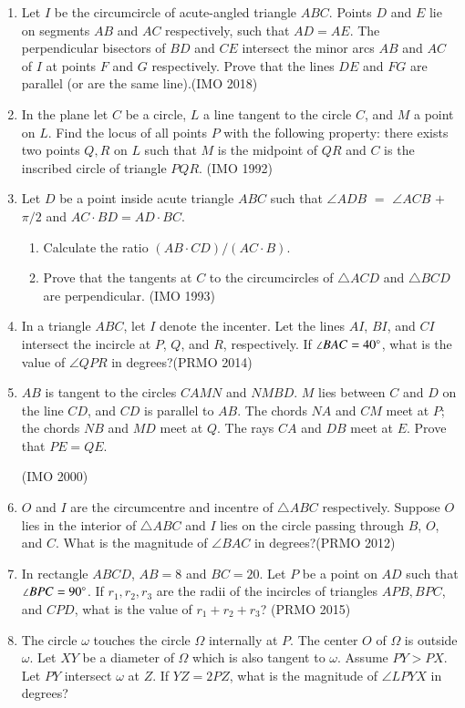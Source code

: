 \begin{enumerate}[label=\thesubsection.\arabic*,ref=\thesubsection.\theenumi]
\item Let $I$ be the circumcircle of acute-angled triangle $ABC$. Points $D$ and $E$     lie on segments $AB$ and $AC$ respectively, such that $AD=AE$. The perpendicular bisectors of $BD$ and $CE$ intersect the minor arcs $AB$ and $AC$ of $I$ at points $F$ and $G$ respectively. Prove that the lines $DE$ and $FG$ are parallel (or are the same line).\hfill (IMO  2018)
\item In the plane let $C$ be a circle, $L$ a line  tangent to the circle $C$, and $M$ a point on $L$. Find the locus of all points $P$ with the following property: there exists two points $Q,R$ on $L$ such that $M$ is the midpoint of $QR$ and $C$ is the inscribed circle of triangle $PQR$.  \hfill(IMO  1992)
\item Let $D$ be a point inside acute triangle $ABC$ such that $\angle ADB$ $=$ $\angle ACB$ $+$ $\pi/2$ and $AC \cdot BD = AD \cdot BC$.
 
\begin{enumerate}
\item Calculate the ratio $(AB \cdot CD) / (AC \cdot B)$.
\item Prove that the tangents at $C$ to the circumcircles of $\triangle ACD$ and $\triangle BCD$ are perpendicular. \hfill(IMO  1993)
\end{enumerate}
\item In a triangle $ABC$, let $I$ denote the incenter. Let the lines $AI$, $BI$, and $CI$ intersect the incircle at $P$, $Q$, and $R$, respectively. If $\angle BAC = 40\degree$, what is the value of $\angle QPR$ in degrees?\hfill(PRMO 2014)
\item $AB$ is tangent to the circles $CAMN$ and $NMBD$. $M$ lies between $C$ and $D$ on the line $CD$, and $CD$ is parallel to $AB$. The chords $NA$ and $CM$ meet at $P$; the chords $NB$ and $MD$ meet at $Q$. The rays $CA$ and $DB$ meet at $E$. Prove that $PE = QE$.

	\hfill(IMO 2000)
\item $O$ and $I$ are the circumcentre and incentre of $\triangle ABC$ respectively. Suppose $O$ lies in the interior of $\triangle ABC$ and $I$ lies on the circle passing through $B$, $O$, and $C$. What is the magnitude of $\angle BAC$ in degrees?\hfill(PRMO 2012)
    \item In rectangle $ ABCD $, $ AB = 8 $ and $ BC = 20 $. Let $ P $ be a point on $ AD $ such that $ \angle BPC = 90\degree $. If $ r_1, r_2, r_3 $ are the radii of the incircles of triangles $ APB, BPC $, and $ CPD $, what is the value of $ r_1 + r_2 + r_3 $? \hfill(PRMO 2015)
\item The circle $ \omega $ touches the circle $ \Omega $ internally at $ P $. The center $ O $ of $ \Omega $ is outside $ \omega $. Let $XY$ be a diameter of $ \Omega $ which is also tangent to $ \omega $. Assume $ PY > PX $. Let $ PY $ intersect $ \omega $ at $ Z $. If $ YZ = 2PZ $, what is the magnitude of $ \angle LPYX $ in degrees? 


\end{enumerate}
